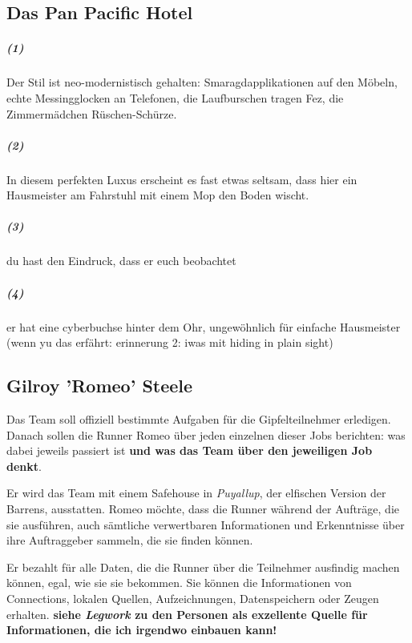 \subsection{Das Pan Pacific Hotel}



\subparagraph{(1)} Der Stil ist neo-modernistisch gehalten: Smaragdapplikationen auf den Möbeln, echte Messingglocken an Telefonen, die Laufburschen tragen Fez, die Zimmermädchen Rüschen-Schürze. 
\subparagraph{(2)} In diesem perfekten Luxus erscheint es fast etwas seltsam, dass hier ein Hausmeister am Fahrstuhl mit einem Mop den Boden wischt. 
\subparagraph{(3)} du hast den Eindruck, dass er euch beobachtet
\subparagraph{(4)} er hat eine cyberbuchse hinter dem Ohr, ungewöhnlich für einfache Hausmeister (wenn yu das erfährt: erinnerung 2: iwas mit hiding in plain sight)


\subsection{Gilroy 'Romeo' Steele}

Das Team soll offiziell bestimmte Aufgaben für die Gipfelteilnehmer erledigen. Danach sollen die Runner Romeo über jeden einzelnen dieser Jobs berichten: was dabei jeweils passiert ist \textbf{und was das Team über den jeweiligen Job denkt}.

Er wird das Team mit einem Safehouse in \textit{Puyallup}, der elfischen Version der Barrens, ausstatten. Romeo möchte, dass die Runner während der Aufträge, die sie ausführen, auch sämtliche verwertbaren Informationen und Erkenntnisse über ihre Auftraggeber sammeln, die sie finden können.

Er bezahlt für alle Daten, die die Runner über die Teilnehmer ausfindig machen können, egal, wie sie sie bekommen. Sie können die Informationen von Connections, lokalen Quellen, Aufzeichnungen, Datenspeichern oder Zeugen erhalten. \textbf{siehe \textit{Legwork} zu den Personen als exzellente Quelle für Informationen, die ich irgendwo einbauen kann!} 


